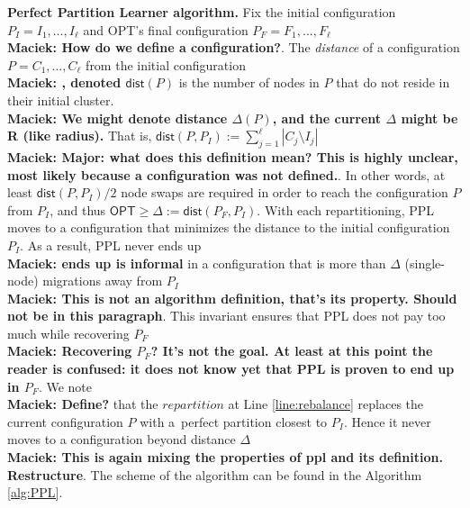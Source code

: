 \documentclass[manuscript,screen=true, review, anonymous]{acmart}
\newcommand{\OPT}{\textsf{OPT}\xspace}
\newcommand{\PPL}{\textsf{PPL}\xspace}
\newcommand{\dist}{\textsf{dist}}
\newcommand\maciek[1]{\color{brown}\textbf{\\ Maciek: #1}\color{black}}
\begin{document}
\noindent
\textbf{Perfect Partition Learner algorithm.}
Fix the initial configuration
$P_I = I_1, \dots, I_{\ell}$ and \OPT's final configuration
$P_F = F_1, \dots, F_{\ell}$\maciek{How do we define a configuration?}.
The \emph{distance} of a configuration $P = C_1, \dots, C_{\ell}$ from the initial configuration \maciek{, denoted $\dist(P)$} is the number of nodes in $P$ that do not reside in their initial cluster.
\maciek{We might denote distance $\Delta(P)$, and the current $\Delta$ might be R (like radius).}
That is,
$\dist(P, P_I) := \sum_{j=1}^{\ell} | C_j \setminus I_j |$
\maciek{Major: what does this definition mean? This is highly unclear, most likely because a configuration was not defined.}. 
In other words,
at least $\dist(P, P_I)/2$ node swaps are required in order to reach the configuration $P$ from $P_I$, and thus
$\OPT \geq \Delta:= \dist(P_F, P_I) $.
With each repartitioning,
\PPL moves to a configuration that minimizes the distance to the initial configuration $P_I$.
As a result,
\PPL never ends up \maciek{ends up is informal} in a configuration that is more than $\Delta$ (single-node) migrations away from $P_I$ \maciek{This is not an algorithm definition, that's its property. Should not be in this paragraph}.
This invariant ensures that \PPL does not pay too much while recovering $P_F$ \maciek{Recovering $P_F$? It's not the goal. At least at this point the reader is confused: it does not know yet that PPL is proven to end up in $P_F$}.
We note \maciek{Define?} that the $\mathit{repartition}$ at Line \ref{line:rebalance} replaces the current configuration $P$ with a~perfect partition closest to $P_I$.
Hence it never moves to a configuration beyond distance $\Delta$ \maciek{This is again mixing the properties of ppl and its definition. Restructure}.
The scheme of the algorithm can be found in the Algorithm \ref{alg:PPL}.
\end{document}
